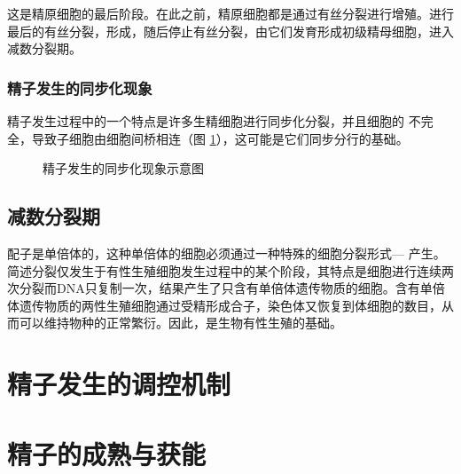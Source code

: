 这是精原细胞的最后阶段。在此之前，精原细胞都是通过有丝分裂进行增殖。进行最后的有丝分裂，形成，随后停止有丝分裂，由它们发育形成初级精母细胞，进入减数分裂期。

\subsubsection{精子发生的同步化现象}

精子发生过程中的一个特点是许多生精细胞进行同步化分裂，并且细胞的
不完全，导致子细胞由细胞间桥相连（图 \ref{figure_spermatogenesis_synchronization}），这可能是它们同步分行的基础。

\begin{figure}
\centering
\myFigurePlaceholder
\caption{精子发生的同步化现象示意图}
\label{figure_spermatogenesis_synchronization}
\end{figure}

\subsection{减数分裂期}

配子是单倍体的，这种单倍体的细胞必须通过一种特殊的细胞分裂形式---
产生。简述分裂仅发生于有性生殖细胞发生过程中的某个阶段，其特点是细胞进行连续两次分裂而DNA只复制一次，结果产生了只含有单倍体遗传物质的细胞。含有单倍体遗传物质的两性生殖细胞通过受精形成合子，染色体又恢复到体细胞的数目，从而可以维持物种的正常繁衍。因此，是生物有性生殖的基础。


\section{精子发生的调控机制}


\section{精子的成熟与获能}